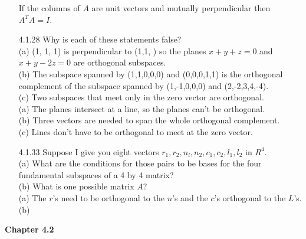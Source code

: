 \documentclass[10pt,twoside,reqno]{article}
\begin{document}
\begin{enumerate}
\hspace{10mm}If the columns of $A$ are unit vectors and mutually perpendicular then $A^TA=I$. \\
\vspace{3mm}
\item[4.1.28] Why is each of these statements false? \\
{\addtolength{\leftskip}{5mm}
(a) (1, 1, 1) is perpendicular to (1,1, ) so the planes $x + y + z = 0$ and $x + y - 2z = 0$ are orthogonal subspaces. \\
(b) The subspace spanned by (1,1,0,0,0) and (0,0,0,1,1) is the orthogonal complement of the subspace spanned by (1,-1,0,0,0) and (2,-2,3,4,-4). \\
(c) Two subspaces that meet only in the zero vector are orthogonal. \\
}
\vspace{3mm}
{\addtolength{\leftskip}{10mm}
(a) The planes intersect at a line, so the planes can't be orthogonal. \\
(b) Three vectors are needed to span the whole orthogonal complement. \\
(c) Lines don't have to be orthogonal to meet at the zero vector. \\
}
\vspace{3mm}
\item[4.1.33] Suppose I give you eight vectors $r_1, r_2, n_l, n_2, c_1, c_2, l_1,l_2$ in $R^4$. \\
{\addtolength{\leftskip}{5mm}
(a) What are the conditions for those pairs to be bases for the four fundamental subspaces of a 4 by 4 matrix? \\
(b) What is one possible matrix $A$? \\
}
\vspace{3mm}
{\addtolength{\leftskip}{10mm}
(a) The $r$'s need to be orthogonal to the $n$'s and the $c$'s orthogonal to the $L$'s. \\
(b) \\
}
\vspace{3mm}
\end{enumerate}
\vspace{5mm}
\textbf{Chapter 4.2}
\end{document}

